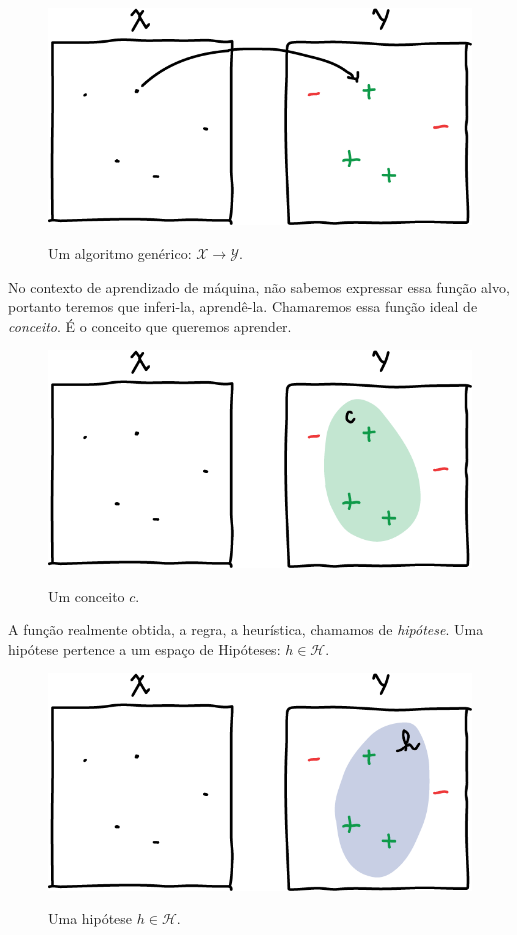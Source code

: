 \documentclass[
10pt, %
a4paper, %
onecolumn, %
]{article}
\begin{document}
\begin{figure}[!htp]
    \centering
    \includegraphics[width=.8\textwidth]{function}
    \label{function}
    \caption{Um algoritmo genérico: $\mathcal{X} \to \mathcal{Y}$.}
\end{figure}

No contexto de aprendizado de máquina, não sabemos expressar essa função alvo, portanto teremos que inferi-la, aprendê-la. Chamaremos essa função ideal de \emph{conceito}. É o conceito que queremos aprender.

\begin{figure}[!htp]
    \centering
    \includegraphics[width=.8\textwidth]{concept}
    \label{concept}
    \caption{Um conceito $c$.}
\end{figure}

A função realmente obtida, a regra, a heurística, chamamos de \emph{hipótese}. Uma hipótese pertence a um espaço de Hipóteses: $h \in \mathcal{H}$.
\begin{figure}[!htp]
    \centering
    \includegraphics[width=.8\textwidth]{hypothesis}
    \label{hypothesis}
    \caption{Uma hipótese $h \in \mathcal{H}$.}
\end{figure}
\end{document}
